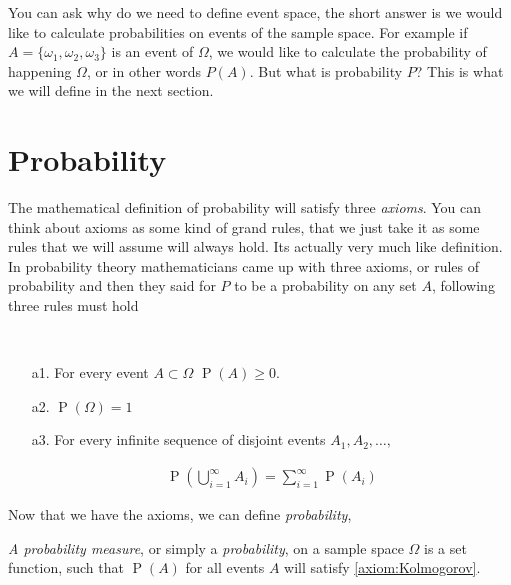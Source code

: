 \documentclass[ 11pt,%
				a4paper,%
				oneside,%
				headinclude,%
				footinclude = true,%
				cleardoublepage = empty,%
				reqno]{scrbook}
\begin{document}
		You can ask why do we need to define  event space, the short answer is we would like to calculate probabilities on events of the sample space. For example if $A = \{ \omega_1, \omega_2, \omega_3\}$ is an event of $\Omega$, we would like to calculate the probability of happening $\Omega$, or in other words $P(A)$. But what is probability $P$? This is what we will define in the next section. 

		\section{Probability}

			The mathematical definition of probability will satisfy three \emph{axioms}. You can think about axioms as some kind of grand rules, that we just take it as some rules that we will assume will always hold. Its actually very much like definition. In probability theory mathematicians came up with three axioms, or rules of probability and then they said for $P$ to be a probability on any set $A$, following three rules must hold

			\begin{axioms}~\label{axiom:Kolmogorov}
				\begin{itemize}
					\item[]
					\item[a1.] For every event $A \subset \Omega$ $\operatorname{P}(A) \geq 0$.

					\item[a2.] $\operatorname{P}(\Omega)=1$

					\item[a3.] For every infinite sequence of disjoint events $A_{1}, A_{2}, \ldots,$

					\begin{align*}
						\operatorname{P}\left(\bigcup_{i=1}^{\infty} A_{i}\right)=\sum_{i=1}^{\infty} \operatorname{P}\left(A_{i}\right)
					\end{align*}

				\end{itemize}
			\end{axioms}


			Now that we have the axioms, we can define \emph{probability},

			\begin{definition}[Probability]
				\emph{A probability measure}, or simply a \emph{probability}, on a sample space $\Omega$ is a set function, such that $\operatorname{P}(A)$ for all events $A$ will satisfy \cref{axiom:Kolmogorov}.
			\end{definition}
\end{document}

